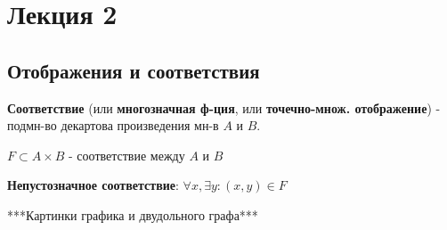 \section{Лекция 2}

\subsection{Отображения и соответствия}
\begin{definition}
\textbf{Соответствие} (или \textbf{многозначная ф-ция}, или \textbf{точечно-множ. отображение}) - подмн-во декартова произведения мн-в $A$ и $B$.

$F \subset A \times B$ - соответствие между $A$ и $B$
\end{definition}
\begin{note}
\textbf{Непустозначное соответствие}: $\forall x, \exists y \colon  (x, y) \in F$
\end{note}

***Картинки графика и двудольного графа***

